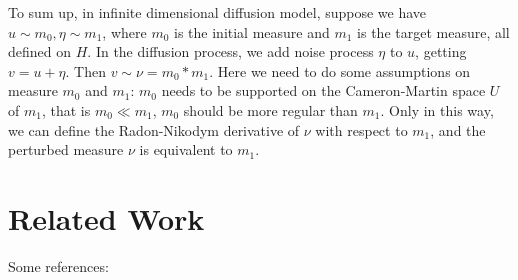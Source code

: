 \documentclass{article}
\begin{document}
To sum up, in infinite dimensional diffusion model, suppose we have $u\sim m_0, \eta\sim m_1$, where $m_0$ is the initial measure and $m_1$ is the target measure, all defined on $H$.
In the diffusion process, we add noise process $\eta$ to $u$, getting $v = u + \eta$. Then $v\sim \nu=m_0 * m_1$. Here we need to do some assumptions on measure $m_0$ and $m_1$: 
$m_0$ needs to be supported on the Cameron-Martin space $U$ of $m_1$, that is $m_0 \ll m_1$, $m_0$ should be more regular than $m_1$. 
Only in this way, we can define the Radon-Nikodym derivative of $\nu$ with respect to $m_1$, and the perturbed measure $\nu$ is equivalent to $m_1$.

\section{Related Work}
Some references: \cite{whittle1954stationary, carrizo2022general, lindgren2020diffusion, sigrist2015stochastic, bolin2020rational, Porcu2023}

\cite{dupont2022generativemodelsdistributionsfunctions}
\cite{mittal2022pointsfunctionsinfinitedimensionalrepresentations}
\end{document}
